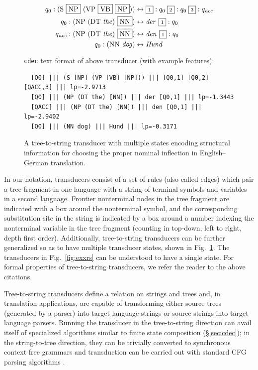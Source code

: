 \documentclass[nofonts]{pbml} %
\begin{document}
\begin{figure}
\begin{small}
\begin{align*}
q_0 : \textrm{(S \fbox{NP} (VP \fbox{VB} \fbox{NP}))} &\leftrightarrow \scriptsize{\fbox{1}}:q_0\ \scriptsize{\fbox{2}}:q_0\ \scriptsize{\fbox{3}}:q_{\textrm{\emph{acc}}} \\
q_0 : \textrm{(NP (DT \emph{the}) \fbox{NN})} &\leftrightarrow \textrm{\emph{der }}  \scriptsize{\fbox{1}}:q_0 \\
q_{\textrm{\emph{acc}}} : \textrm{(NP (DT \emph{the}) \fbox{NN})} &\leftrightarrow \textrm{\emph{den }}  \scriptsize{\fbox{1}}:q_0 \\
q_0 : \textrm{(NN \emph{dog})} &\leftrightarrow \textrm{\emph{Hund}}
\end{align*}
\end{small}
{\tt cdec} text format of above transducer (with example features):
\begin{small}
\begin{verbatim}
  [Q0] ||| (S [NP] (VP [VB] [NP])) ||| [Q0,1] [Q0,2] [QACC,3] ||| lp=-2.9713
  [Q0] ||| (NP (DT the) [NN]) ||| der [Q0,1] ||| lp=-1.3443
  [QACC] ||| (NP (DT the) [NN]) ||| den [Q0,1] ||| lp=-2.9402
  [Q0] ||| (NN dog) ||| Hund ||| lp=-0.3171
\end{verbatim}
\end{small}
\caption{\label{fig:multistate}A tree-to-string transducer with multiple states encoding structural information for choosing the proper nominal inflection in English--German translation.}
\end{figure}
In our notation, transducers consist of a set of rules (also called edges) which pair a tree fragment in one language with a string of terminal symbols and variables in a second language. Frontier nonterminal nodes in the tree fragment are indicated with a box around the nonterminal symbol, and the corresponding substitution site in the string is indicated by a box around a number indexing the nonterminal variable in the tree fragment (counting in top-down, left to right, depth first order). Additionally, tree-to-string transducers can be further generalized so as to have multiple transducer states, shown in Fig.~\ref{fig:multistate}. The transducers in Fig.~\ref{fig:exxrs} can be understood to have a single state. For formal properties of tree-to-string transducers, we refer the reader to the above citations. 

Tree-to-string transducers define a relation on strings and trees and, in translation applications, are capable of transforming either source trees (generated by a parser) into target language strings or source strings into target language parsers. Running the transducer in the tree-to-string direction can avail itself of specialized algorithms similar to finite state composition (\S\ref{sec:cdec}); in the string-to-tree direction, they can be trivially converted to synchronous context free grammars and transduction can be carried out with standard CFG parsing algorithms \citep{Galley2004}.
\end{document}
